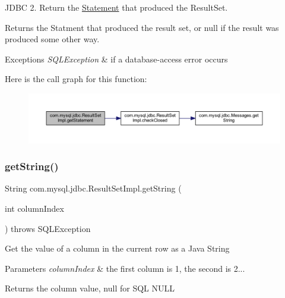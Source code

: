 J\+D\+BC 2. Return the \mbox{\hyperlink{interfacecom_1_1mysql_1_1jdbc_1_1_statement}{Statement}} that produced the Result\+Set.

\begin{DoxyReturn}{Returns}
the Statment that produced the result set, or null if the result was produced some other way.
\end{DoxyReturn}

\begin{DoxyExceptions}{Exceptions}
{\em S\+Q\+L\+Exception} & if a database-\/access error occurs \\
\hline
\end{DoxyExceptions}
Here is the call graph for this function\+:
\nopagebreak
\begin{figure}[H]
\begin{center}
\leavevmode
\includegraphics[width=350pt]{classcom_1_1mysql_1_1jdbc_1_1_result_set_impl_aa273417ff6343608afc4e9dfd9972f8a_cgraph}
\end{center}
\end{figure}
\mbox{\label{classcom_1_1mysql_1_1jdbc_1_1_result_set_impl_a2f04584d83a8ddae4774dfaeb1a1aac7}} 
\subsubsection{\texorpdfstring{get\+String()}{getString()}\hspace{0.1cm}{\footnotesize\ttfamily [1/2]}}
{\footnotesize\ttfamily String com.\+mysql.\+jdbc.\+Result\+Set\+Impl.\+get\+String (\begin{DoxyParamCaption}\item[{int}]{column\+Index }\end{DoxyParamCaption}) throws S\+Q\+L\+Exception}

Get the value of a column in the current row as a Java String


\begin{DoxyParams}{Parameters}
{\em column\+Index} & the first column is 1, the second is 2...\\
\hline
\end{DoxyParams}
\begin{DoxyReturn}{Returns}
the column value, null for S\+QL N\+U\+LL
\end{DoxyReturn}

